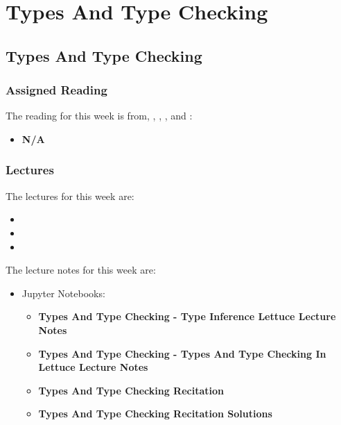 \clearpage

\renewcommand{\ChapTitle}{Types And Type Checking}
\renewcommand{\SectionTitle}{Types And Type Checking}

\chapter{\ChapTitle}

\section{\SectionTitle}

\subsection{Assigned Reading}

The reading for this week is from, \AtomicScalaBook, \EssOfPPLBook, \FuncOfPPLBook, and \ProgInScalaBook:

\begin{itemize}
    \item \textbf{N/A}
\end{itemize}

\subsection{Lectures}

The lectures for this week are:

\begin{itemize}
    \item {}
    \item {}
    \item {}
\end{itemize}

\noindent The lecture notes for this week are:

\begin{itemize}
    \item Jupyter Notebooks:
    \begin{itemize}
        \item \textbf{Types And Type Checking - Type Inference Lettuce Lecture Notes}
        \item \textbf{Types And Type Checking - Types And Type Checking In Lettuce Lecture Notes}
        \item \textbf{Types And Type Checking Recitation}
        \item \textbf{Types And Type Checking Recitation Solutions}
    \end{itemize}
\end{itemize}

